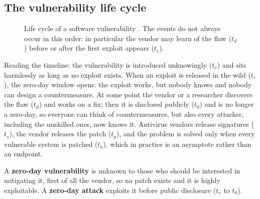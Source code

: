 \subsection{The vulnerability life cycle}

\begin{figure}[H]
\centering
{}
\caption{Life cycle of a software vulnerability \cite{bilge2012}. The events do not always occur in this order: in particular the vendor may learn of the flaw ($t_d$) before or after the first exploit appears ($t_e$).}
\label{fig:vuln-lifecycle}
\end{figure}

Reading the timeline: the vulnerability is introduced unknowingly ($t_v$) and sits harmlessly as long as no exploit exists. When an exploit is released in the wild ($t_e$), the zero-day window opens: the exploit works, but nobody knows and nobody can design a countermeasure. At some point the vendor or a researcher discovers the flaw ($t_d$) and works on a fix; then it is disclosed publicly ($t_0$) and is no longer a zero-day, so everyone can think of countermeasures, but also every attacker, including the unskilled ones, now knows it. Antivirus vendors release signatures ($t_s$), the vendor releases the patch ($t_p$), and the problem is solved only when every vulnerable system is patched ($t_a$), which in practice is an asymptote rather than an endpoint.

\begin{definition}
A \textbf{zero-day vulnerability} is unknown to those who should be interested in mitigating it, first of all the vendor, so no patch exists and it is highly exploitable. A \textbf{zero-day attack} exploits it before public disclosure ($t_e$ to $t_0$).
\end{definition}

